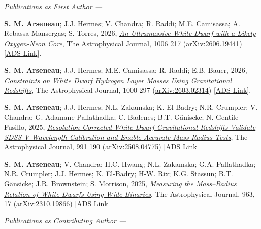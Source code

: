 \documentclass[11pt]{article}       %
\newcommand{\doi}[2]{\emph{\href{http://dx.doi.org/#1}{{#2}}}}
\newcommand{\arxiv}[1]{{\href{http://arxiv.org/abs/#1}{arXiv:{#1}}}}
\begin{document}
\textit{Publications as First Author ---}

\begin{etaremune}
  \item \textbf{S. M. Arseneau}; J.J. Hermes; V. Chandra; R. Raddi; M.E. Camisassa; A. Rebassa-Mansergas; S. Torres, 2026, \doi{10.3847/1538-4357/ae7f0b}{An Ultramassive White Dwarf with a Likely Oxygen-Neon Core}, The Astrophysical Journal, 1006 217 (\arxiv{2606.19441}) [\href{https://ui.adsabs.harvard.edu/abs/2026arXiv260619441A/abstract}{ADS Link}].
  
  \item \textbf{S. M. Arseneau}; J.J. Hermes; M.E. Camisassa; R. Raddi; E.B. Bauer, 2026, \doi{10.3847/1538-4357/ae4c4b}{Constraints on White Dwarf Hydrogen Layer Masses Using Gravitational Redshifts}, The Astrophysical Journal, 1000 297 (\arxiv{2603.02314}) [\href{https://ui.adsabs.harvard.edu/abs/2026arXiv260302314A}{ADS Link}].
  
  \item \textbf{S. M. Arseneau}; J.J. Hermes; N.L. Zakamska; K. El-Badry; N.R. Crumpler; V. Chandra; G. Adamane Pallathadka; C. Badenes; B.T. G\"aniscke; N. Gentile Fusillo, 2025, \doi{10.3847/1538-4357/adf8dd}{Resolution-Corrected White Dwarf Gravitational Redshifts Validate SDSS-V Wavelength Calibration and Enable Accurate Mass-Radius Tests}, The Astrophysical Journal, 991 190 (\arxiv{2508.04775}) [\href{https://ui.adsabs.harvard.edu/abs/2025ApJ...991..190A/}{ADS Link}]

  \item \textbf{S. M. Arseneau}; V. Chandra; H.C. Hwang; N.L. Zakamska; G.A. Pallathadka; N.R. Crumpler; J.J. Hermes; K. El-Badry; H-W. Rix; K.G. Stassun; B.T. G\"ansicke; J.R. Brownstein; S. Morrison, 2025, \doi{10.3847/1538-4357/ad2168}{Measuring the Mass–Radius Relation of White Dwarfs Using Wide Binaries}, The Astrophysical Journal, 963, 17 (\arxiv{2310.19866}) [\href{https://ui.adsabs.harvard.edu/abs/2024ApJ...963...17A/abstract}{ADS Link}]
\end{etaremune}

\textit{Publications as Contributing Author ---}
\end{document}

